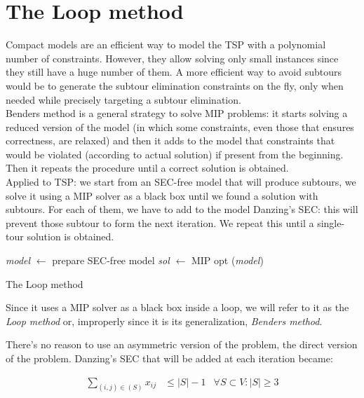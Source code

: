 \section{The Loop method}
Compact models are an efficient way to model the TSP with a polynomial number of
constraints. However, they allow solving only small instances since they still
have a huge number of them. A more efficient way to avoid subtours would be to
generate the subtour elimination constraints on the fly, only when needed while
precisely targeting a subtour elimination.\\
Benders method is a general strategy to solve MIP problems: it starts solving a
reduced version of the model (in which some constraints, even those that ensures
correctness, are relaxed) and then it adds to the model that constraints that
would be violated (according to actual solution) if present from the beginning.
Then it repeats the procedure until a correct solution is obtained.\\
Applied to TSP: we start from an SEC-free model that will produce subtours, we
solve it using a MIP solver as a black box until we found a solution with
subtours. For each of them, we have to add to the model Danzing's SEC: this will
prevent those subtour to form the next iteration. We repeat this until a
single-tour solution is obtained.

\begin{algorithm}[H]
\SetAlgoLined
{}
    \emph{model} $\leftarrow$ prepare SEC-free model\;
    \emph{sol} $\leftarrow$ MIP opt (\emph{model})\;
    \caption{The Loop method}
\end{algorithm}

Since it uses a MIP solver as a black box inside a loop, we will refer to it as
the \emph{Loop method} or, improperly since it is its generalization,
\emph{Benders method}.

There's no reason to use an asymmetric version of the problem, the direct
version of the problem. Danzing's SEC that will be added at each iteration
became:

\begin{equation*} 
    \begin{array}{rrlr} 
        \displaystyle\sum_{(i,j) \in (S)} x_{ij} & \le |S|-1 & \forall S \subset V: |S| \ge 3
    \end{array} 
\end{equation*}

